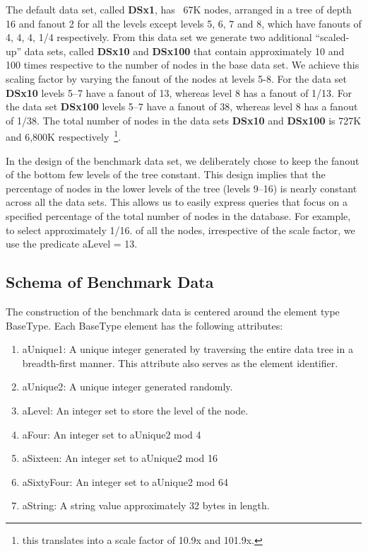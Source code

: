 The default data set, called {\bf DSx1}, has ~67K nodes, arranged in a
tree of depth 16 and fanout 2 for all the levels except levels 5, 6, 7
and 8, which have fanouts of 4, 4, 4, 1/4 respectively. From this data set we
generate two additional ``scaled-up'' data sets, called {\bf DSx10}
and {\bf DSx100} that contain approximately 10 and 100 times respective to the
number of nodes in the base data set. We achieve this scaling factor
by varying the fanout of the nodes at levels 5-8. For the data set
{\bf DSx10} levels 5--7 have a fanout of 13, whereas level 8 has a
fanout of 1/13. For the data set {\bf DSx100} levels 5--7 have a
fanout of 38, whereas level 8 has a fanout of 1/38. The total number
of nodes in the data sets {\bf DSx10} and {\bf DSx100} is 727K and
6,800K respectively~\footnote{this translates into a scale factor of 10.9x and
101.9x.}.

In the design of the benchmark data set, we deliberately chose to keep
the fanout of the bottom few levels of the tree constant.  This design
implies that the percentage of nodes in the lower levels of the tree
(levels 9--16) is nearly constant across all the data sets. This
allows us to easily express queries that focus on a specified
percentage of the total number of nodes in the database. For example,
to select approximately 1/16. of all the nodes, irrespective of the
scale factor, we use the predicate {\sf aLevel = 13}.

\subsection{Schema of Benchmark Data}
\label{sec:bench-data}
The construction of the benchmark data is centered around the element
type {\sf BaseType}. Each {\sf BaseType} element has the following
attributes:
\begin {enumerate}
\item {\sf aUnique1}: A unique integer generated by traversing
the entire data tree in a breadth-first manner.  This attribute also
serves as the element identifier.
\item {\sf aUnique2}: A unique integer generated randomly.
\item {\sf aLevel}: An integer set to store the level of the node.
\item {\sf aFour}: An integer set to aUnique2 mod 4
\item {\sf aSixteen}: An integer set to aUnique2 mod 16
\item {\sf aSixtyFour}: An integer set to aUnique2 mod 64
\item {\sf aString}: A string value approximately 32 bytes in length.
\end {enumerate}

